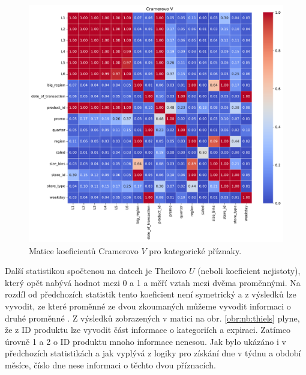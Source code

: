\begin{figure}[h!]
    \centering
    \includegraphics[width=\textwidth]{obrazky/pripravadat/correlation_matrix_cramers-everything-SFF-stores_targets002.pdf}
    \caption{Matice koeficientů Cramerovo $V$ pro kategorické příznaky.}
    \label{obr:nb:cramers}
\end{figure}

Další statistikou spočtenou na datech je Theilovo $U$ (neboli koeficient nejistoty), který opět nabývá hodnot mezi 0 a 1 a měří vztah mezi dvěma proměnnými. Na rozdíl od předchozích statistik tento koeficient není symetrický a z výsledků lze vyvodit, ze které proměnné ze dvou zkoumaných můžeme vyvodit informaci o druhé proměnné \cite{bib:correl}. Z výsledků zobrazených v matici na obr. \ref*{obr:nb:thiels} plyne, že z ID produktu lze vyvodit část informace o kategoriích a expiraci. Zatímco úrovně 1 a 2 o ID produktu mnoho informace nenesou. Jak bylo ukázáno i v předchozích statistikách a jak vyplývá z logiky pro získání dne v týdnu a období měsíce, číslo dne nese informaci o těchto dvou příznacích.

